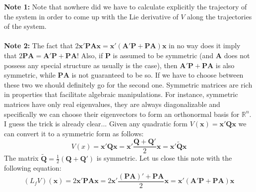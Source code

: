 \documentclass[a4paper,10pt,oneside]{book}
\begin{document}
%
%
\noindent \textbf{Note 1:} Note that nowhere did we have to calculate explicitly the trajectory of the system in order to come up with the Lie derivative of $V$ along the trajectories of the system.\\
\\
%
%
\noindent \textbf{Note 2:} The fact that $2\mathbf{x}'\mathbf{PAx}=\mathbf{x}'(\mathbf{A}'\mathbf{P}+\mathbf{PA})\mathbf{x}$ in no way does it imply that $2\mathbf{PA}=\mathbf{A}'\mathbf{P}+\mathbf{PA}$! Also, if $\mathbf{P}$ is assumed to be symmetric (and $\mathbf{A}$ does not possess any special structure as usually is the case), then $\mathbf{A}'\mathbf{P}+\mathbf{PA}$ is also symmetric, while $\mathbf{PA}$ is not guaranteed to be so. If we have to choose between these two we should definitely go for the second one. Symmetric matrices are rich in properties that facilitate algebraic manipulations. For instance, symmetric matrices have only real eigenvalues, they are always diagonalizable and specifically we can choose their eigenvectors to form an orthonormal basis for $\mathbb{R}^n$. I guess the trick is already clear... Given any quadratic form $V(\mathbf{x})=\mathbf{x}'\mathbf{Qx}$ we can convert it to a symmetric form as follows:
\begin{equation}
 V(x)=\mathbf{x}'\mathbf{Qx}=\mathbf{x}'\frac{\mathbf{Q}+\mathbf{Q}'}{2}\mathbf{x}=\mathbf{x}'\tilde{\mathbf{Q}}\mathbf{x}
\end{equation}
The matrix $\tilde{\mathbf{Q}}=\frac{1}{2}(\mathbf{Q}+\mathbf{Q}')$ is symmetric. Let us close this note with the following equation:
\begin{equation}
 (L_f V)(\mathbf{x})=2\mathbf{x}'\mathbf{PA}\mathbf{x}=2\mathbf{x}'\frac{(\mathbf{PA})'+\mathbf{PA}}{2}\mathbf{x}=\mathbf{x}'(\mathbf{A}'\mathbf{P}+\mathbf{PA})\mathbf{x}
\end{equation}
\end{document}
